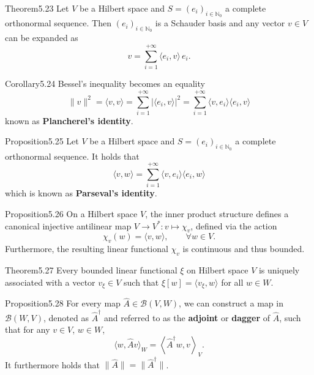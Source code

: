 \begin{res}{Theorem}{5.23}
Let $V$ be a Hilbert space and $S=(e_i)_{i\in\mathbb N_0}$ a complete orthonormal sequence. Then $(e_i)_{i\in\mathbb N_0}$ is a Schauder basis and any vector $v\in V$ can be expanded as
\begin{equation}v=\sum_{i=1}^{+\infty}\langle e_i,v\rangle\,e_i.\tag{5.26}\end{equation}
\end{res}

\begin{res}{Corollary}{5.24}
Bessel's inequality becomes an equality
\begin{equation}\|v\|^2=\langle v,v\rangle=\sum_{i=1}^{+\infty}|\langle e_i,v\rangle|^2=\sum_{i=1}^{+\infty}\langle v,e_i\rangle\langle e_i,v\rangle\tag{5.28}\end{equation}
known as \textbf{Plancherel's identity}.
\end{res}

\begin{res}{Proposition}{5.25}
Let $V$ be a Hilbert space and $S=(e_i)_{i\in\mathbb N_0}$ a complete orthonormal sequence. It holds that
\begin{equation}\langle v,w\rangle=\sum_{i=1}^{+\infty}\langle v,e_i\rangle\langle e_i,w\rangle\tag{5.29}\end{equation}
which is known as \textbf{Parseval's identity}.
\end{res}

\begin{res}{Proposition}{5.26}
On a Hilbert space $V$, the inner product structure defines a canonical injective antilinear map $V\to V^*:v\mapsto\chi_v$, defined via the action
\[\chi_v(w)=\langle v,w\rangle,\qquad\forall w\in V.\]
Furthermore, the resulting linear functional $\chi_v$ is continuous and thus bounded.
\end{res}

\begin{res}{Theorem}{5.27}
Every bounded linear functional $\xi$ on Hilbert space $V$ is uniquely associated with a vector $v_\xi\in V$ such that $\xi[w]=\langle v_\xi,w\rangle$ for all $w\in W$.
\end{res}

\begin{res}{Proposition}{5.28}
For every map $\hat A\in\mathcal B(V,W)$, we can construct a map in $\mathcal B(W,V)$, denoted as $\hat A^\dagger$ and referred to as the \textbf{adjoint} or \textbf{dagger} of $\hat A$, such that for any $v\in V$, $w\in W$,
\begin{equation}\langle w,\hat Av\rangle_W=\left\langle\hat A^\dagger w,v\right\rangle_V.\tag{5.40}\end{equation}
It furthermore holds that $\|\hat A\|=\|\hat A^\dagger\|$.
\end{res}

